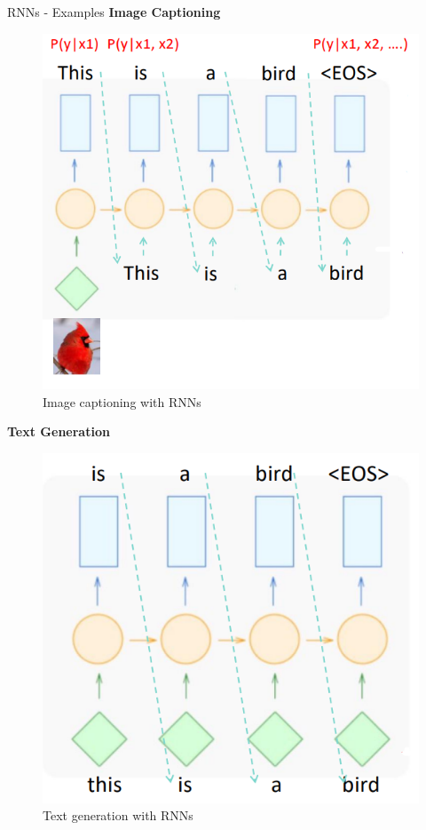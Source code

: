 \begin{frame}[allowframebreaks]{RNNs - Examples}
\textbf{Image Captioning}
\begin{figure}
    \centering
    \includegraphics[height=0.7\textheight, width=\textwidth, keepaspectratio]{images/arm/image_cap.png}
    \caption{Image captioning with RNNs}
\end{figure}

\framebreak
\textbf{Text Generation}
\begin{figure}
    \centering
    \includegraphics[height=0.7\textheight, width=\textwidth, keepaspectratio]{images/arm/text_gen_ex.png}
    \caption{Text generation with RNNs}
\end{figure}


\end{frame}
